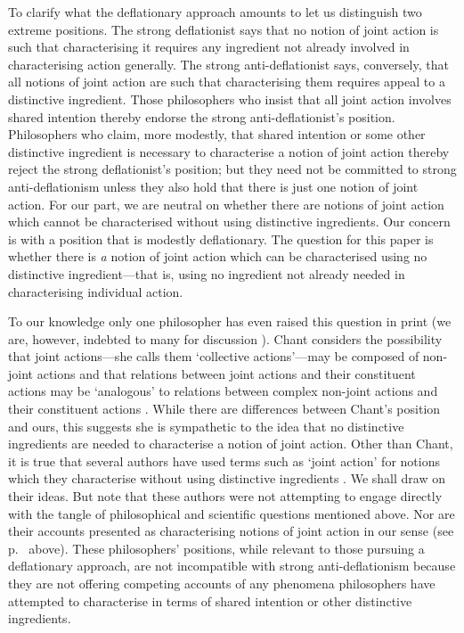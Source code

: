 \documentclass[12pt,a4paper]{extarticle}
\begin{document}
To clarify what the deflationary approach amounts to let us distinguish two extreme positions.
The strong deflationist says that no notion of joint action is such that characterising it requires any ingredient not already involved in characterising action generally.
The strong anti-deflationist says, conversely, that all notions of joint action are such that characterising them requires appeal to a distinctive ingredient.
Those philosophers who insist that all joint action involves shared  intention thereby endorse the strong anti-deflationist's position.
Philosophers who claim, more modestly, that shared intention or some other distinctive ingredient is necessary to characterise a notion of joint action thereby reject the strong deflationist's position; 
but they need not be committed to strong anti-deflationism unless they also hold that there is just one notion of joint action.
For our part, we are neutral on whether there are notions of joint action which cannot be characterised without using distinctive ingredients.
Our concern is with a position that is modestly  deflationary.
The question for this paper is whether there is \emph{a} notion of joint action which can be characterised using no distinctive ingredient---that is, using no ingredient not already needed in characterising individual action. 

To our knowledge only one philosopher has even raised this question in print (we are, however, indebted to many for discussion%
).
Chant considers the possibility that joint actions---she calls them `collective actions'---may be composed of non-joint actions and that relations between joint actions and their constituent actions may be `analogous' to relations between complex non-joint actions and their constituent actions \citep[p.\ 254]{chant_unintentional_2007}.  
While there are differences between Chant's position and ours, this suggests she is sympathetic to the idea that no distinctive ingredients are needed to characterise a notion of joint action.
Other than Chant, it is true that several authors have used terms such as `joint action' for notions which they characterise without using distinctive ingredients \citep[e.g.][]{ludwig_collective_2007,smith_playing_2011}.
We shall draw on their ideas.
But note that these authors were not attempting to engage directly with the tangle of philosophical and scientific questions mentioned above.
Nor are their accounts presented as characterising notions of joint action in our sense (see p.\ \pageref{df_joint_action} above).
These philosophers' positions,
while relevant to those pursuing a deflationary approach,
are not incompatible with strong anti-deflationism because they are not offering competing accounts of any phenomena philosophers have attempted to characterise in terms of shared intention or other distinctive ingredients.
\end{document}
